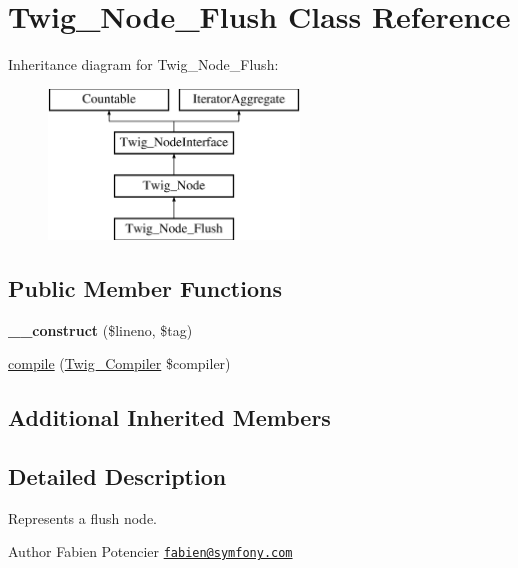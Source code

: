 \hypertarget{classTwig__Node__Flush}{}\section{Twig\+\_\+\+Node\+\_\+\+Flush Class Reference}
\label{classTwig__Node__Flush}
Inheritance diagram for Twig\+\_\+\+Node\+\_\+\+Flush\+:\begin{figure}[H]
\begin{center}
\leavevmode
\includegraphics[height=4.000000cm]{classTwig__Node__Flush}
\end{center}
\end{figure}
\subsection*{Public Member Functions}
\begin{DoxyCompactItemize}
\item 
{\bfseries \+\_\+\+\_\+construct} (\$lineno, \$tag)\hypertarget{classTwig__Node__Flush_a6c8b51c39ccbc3c0e7aa3ed6fb9179b2}{}\label{classTwig__Node__Flush_a6c8b51c39ccbc3c0e7aa3ed6fb9179b2}

\item 
\hyperlink{classTwig__Node__Flush_a7e2a593cf2d06dbe2b600368ce9b4092}{compile} (\hyperlink{classTwig__Compiler}{Twig\+\_\+\+Compiler} \$compiler)
\end{DoxyCompactItemize}
\subsection*{Additional Inherited Members}


\subsection{Detailed Description}
Represents a flush node.

\begin{DoxyAuthor}{Author}
Fabien Potencier \href{mailto:fabien@symfony.com}{\tt fabien@symfony.\+com} 
\end{DoxyAuthor}


